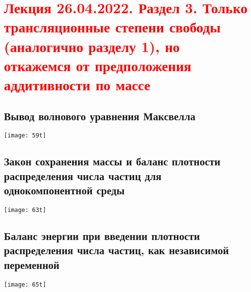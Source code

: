 \documentclass[main.tex]{subfiles}
\begin{document}
\section{\textcolor{red}{Лекция 26.04.2022. Раздел 3. Только трансляционные степени свободы (аналогично разделу 1), но откажемся от предположения аддитивности по массе}}

\subsection{Вывод волнового уравнения Максвелла}
\texttt{[image: 59t]}




\subsection{Закон сохранения массы и баланс плотности распределения числа частиц для однокомпонентной среды}
\texttt{[image: 63t]}


\subsection{Баланс энергии при введении плотности распределения числа частиц, как независимой переменной}
\texttt{[image: 65t]}

\end{document}
